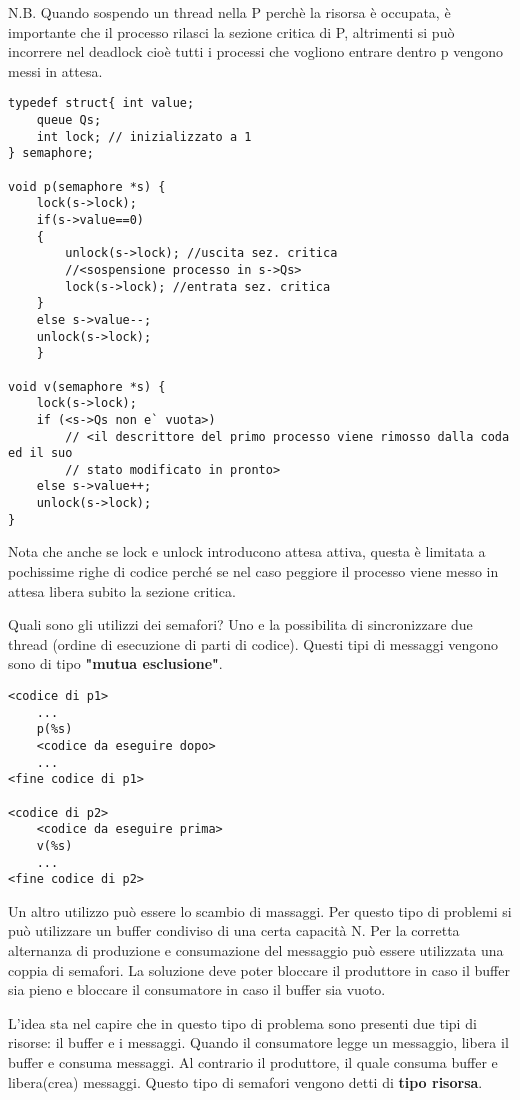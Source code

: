 \documentclass{article}
\begin{document}
\noindent N.B. Quando sospendo un thread nella P perchè la risorsa è occupata, è importante che il processo rilasci la sezione critica 
di P, altrimenti si può incorrere nel deadlock cioè tutti i processi che vogliono entrare dentro p vengono messi in attesa.
\begin{lstlisting}[style=CStyle]
typedef struct{ int value;
    queue Qs;
    int lock; // inizializzato a 1
} semaphore;
 
void p(semaphore *s) {
    lock(s->lock);
    if(s->value==0)
    { 
        unlock(s->lock); //uscita sez. critica
        //<sospensione processo in s->Qs>
        lock(s->lock); //entrata sez. critica
    }
    else s->value--;
    unlock(s->lock);
    }

void v(semaphore *s) {
    lock(s->lock);
    if (<s->Qs non e` vuota>)
        // <il descrittore del primo processo viene rimosso dalla coda ed il suo
        // stato modificato in pronto>
    else s->value++;
    unlock(s->lock);
}
\end{lstlisting}

\noindent Nota che anche se lock e unlock introducono attesa attiva, questa è limitata a pochissime righe di codice perché se nel 
caso peggiore il processo viene messo in attesa libera subito la sezione critica.
\medskip

\noindent Quali sono gli utilizzi dei semafori? Uno e la possibilita di sincronizzare due thread (ordine di
 esecuzione di parti di codice). Questi tipi di messaggi vengono sono di tipo \textbf{"mutua esclusione"}.

\begin{lstlisting}[style=CStyle]
<codice di p1>
    ...
    p(%s)
    <codice da eseguire dopo>
    ...
<fine codice di p1>

<codice di p2>
    <codice da eseguire prima>
    v(%s)
    ...
<fine codice di p2>
\end{lstlisting}

\noindent Un altro utilizzo può essere lo scambio di massaggi. Per questo tipo di problemi si può utilizzare un buffer condiviso di
 una certa capacità N. Per la corretta alternanza di produzione e consumazione del messaggio può essere utilizzata una coppia di semafori. 
 La soluzione deve poter bloccare il produttore in caso il buffer sia pieno e bloccare il consumatore in caso il buffer sia vuoto.

\noindent L'idea sta nel capire che in questo tipo di problema sono presenti due tipi di risorse: il buffer e i messaggi. 
Quando il consumatore legge un messaggio, libera il buffer e consuma messaggi. Al contrario il produttore, il quale consuma buffer e
libera(crea) messaggi. Questo tipo di semafori vengono detti di \textbf{tipo risorsa}.
\end{document}

